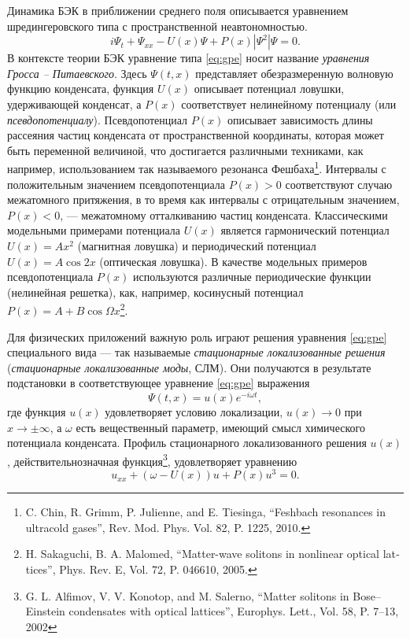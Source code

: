 \documentclass[candidate, href, colorlinks]{disser}
\begin{document}
Динамика БЭК в приближении среднего поля описывается уравнением шредингеровского типа с пространственной неавтономностью.
\begin{equation}
	i \Psi_t + \Psi_{xx} - U(x) \Psi + P(x) |\Psi^2| \Psi = 0.
\label{eq:gpe}
\end{equation}
В контексте теории БЭК уравнение типа \eqref{eq:gpe} носит название {\it уравнения Гросса -- Питаевского}.
Здесь $\Psi(t, x)$ представляет обезразмеренную волновую функцию конденсата, функция $U(x)$ описывает потенциал ловушки, удерживающей конденсат, а $P(x)$ соответствует нелинейному потенциалу (или {\it псевдопотенциалу}).
Псевдопотенциал $P(x)$ описывает зависимость длины рассеяния частиц конденсата от пространственной координаты, которая может быть переменной величиной, что достигается различными техниками, как например, использованием так называемого резонанса Фешбаха\footnote{C. Chin, R. Grimm, P. Julienne, and E. Tiesinga, ``Feshbach resonances in ultracold gases'', Rev. Mod. Phys. Vol. 82, P. 1225, 2010.}.
Интервалы с положительным значением псевдопотенциала $P(x) > 0$ соответствуют случаю межатомного притяжения, в то время как интервалы с отрицательным значением, $P(x) < 0$, ---  межатомному отталкиванию частиц конденсата.
Классическими модельными примерами потенциала $U(x)$ является гармонический потенциал $U(x) = Ax^2$ (магнитная ловушка) и периодический потенциал $U(x) = A \cos 2x$ (оптическая ловушка).
В качестве модельных примеров псевдопотенциала $P(x)$ используются различные периодические функции (нелинейная решетка), как, например, косинусный потенциал $P(x) = A + B \cos \Omega x$\footnote{H. Sakaguchi,  B. A. Malomed, ``Matter-wave solitons in nonlinear optical lat­tices'', Phys. Rev. E, Vol. 72, P. 046610, 2005.}.

Для физических приложений важную роль играют решения уравнения \eqref{eq:gpe} специального вида --- так называемые {\it стационарные локализованные решения} ({\it стационарные локализованные моды}, СЛМ).
Они получаются в результате подстановки в соответствующее уравнение \eqref{eq:gpe} выражения
\begin{equation}
	\Psi(t, x) = u(x) e^{-i \omega t},
\label{eq:ansatz}
\end{equation}
где функция $u(x)$ удовлетворяет условию локализации, $u(x) \to 0$ при $x \to \pm \infty$, а $\omega$ есть вещественный параметр, имеющий смысл химического потенциала конденсата.
Профиль стационарного локализованного решения $u(x)$, действительнозначная функция\footnote{G. L. Alfimov, V. V. Konotop, and M. Salerno, ``Matter solitons in Bose--Einstein condensates with optical lattices'', Europhys. Lett., Vol. 58, P. 7--13, 2002}, удовлетворяет уравнению
\begin{equation}
	u_{xx} + (\omega - U(x)) u + P(x) u^3 = 0.
\label{eq:stationary}
\end{equation}
\end{document}
